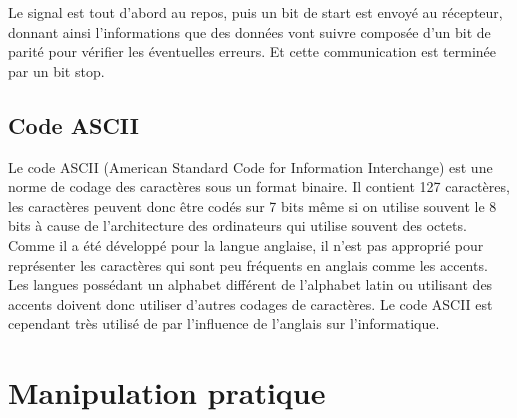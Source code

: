 \documentclass[a4paper]{article}
\begin{document}
Le signal est tout d’abord au repos, puis un bit de start est envoyé au récepteur, donnant ainsi l’informations que des données vont suivre composée d’un bit de parité pour vérifier les éventuelles erreurs. Et cette communication est terminée par un bit stop.










\subsection{Code ASCII}





Le code ASCII (American Standard Code for Information Interchange) est une norme de codage des caractères sous un format binaire. Il contient 127 caractères, les caractères peuvent donc être codés sur 7 bits même si on utilise souvent le 8 bits à cause de l’architecture des ordinateurs qui utilise souvent des octets. Comme il a été développé pour la langue anglaise, il n’est pas approprié pour représenter les caractères qui sont peu fréquents en anglais comme les accents. Les langues possédant un alphabet différent de l’alphabet latin ou utilisant des accents doivent donc utiliser d’autres codages de caractères. Le code ASCII est cependant très utilisé de par l’influence de l’anglais sur l’informatique.















\section{Manipulation pratique}
\end{document}
